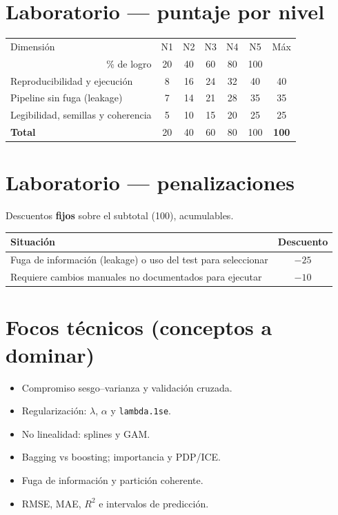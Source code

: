 \documentclass[11pt,letterpaper]{article}
\begin{document}
\section*{Laboratorio --- puntaje por nivel}
\begin{center}\small
\begin{tabular}{l ccccc c}
\toprule
Dimensión & N1 & N2 & N3 & N4 & N5 & Máx \\
\multicolumn{1}{r}{\footnotesize \% de logro} & 20 & 40 & 60 & 80 & 100 & \\
\midrule
Reproducibilidad y ejecución & 8 & 16 & 24 & 32 & 40 & 40 \\
Pipeline sin fuga (leakage) & 7 & 14 & 21 & 28 & 35 & 35 \\
Legibilidad, semillas y coherencia & 5 & 10 & 15 & 20 & 25 & 25 \\
\midrule
\textbf{Total} & 20 & 40 & 60 & 80 & 100 & \textbf{100} \\
\bottomrule
\end{tabular}\end{center}
\section*{Laboratorio --- penalizaciones}
Descuentos \textbf{fijos} sobre el subtotal (100), acumulables.
\begin{center}\small
\begin{tabular}{p{11cm} c}
\toprule
Situación & Descuento \\
\midrule
Fuga de información (leakage) o uso del test para seleccionar & $-25$ \\
Requiere cambios manuales no documentados para ejecutar & $-10$ \\
\bottomrule
\end{tabular}\end{center}
\section*{Focos técnicos (conceptos a dominar)}
\begin{itemize}
\item Compromiso sesgo--varianza y validación cruzada.
\item Regularización: $\lambda$, $\alpha$ y \texttt{lambda.1se}.
\item No linealidad: splines y GAM.
\item Bagging vs boosting; importancia y PDP/ICE.
\item Fuga de información y partición coherente.
\item RMSE, MAE, $R^2$ e intervalos de predicción.
\end{itemize}
\end{document}
